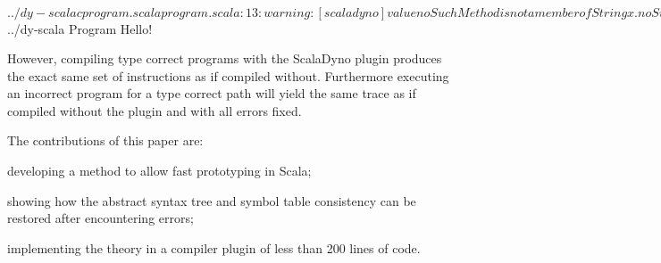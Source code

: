 \begin{lstlisting-nobreak}
$ ../dy-scalac program.scala
program.scala:13: warning: [scaladyno] value noSuchMethod is not a member of String
     x.noSuchMethod()
       ^
one warning found
$ ../dy-scala Program
Hello!
\end{lstlisting-nobreak}

However, compiling type correct programs with the Scala\-Dyno plugin produces the exact same set of instructions as if compiled without. Furthermore executing an incorrect program for a type correct path will yield the same trace as if compiled without the plugin and with all errors fixed.\linebreak

The contributions of this paper are:
\begin{packed_item}
\item developing a method to allow fast prototyping in Scala;
\item showing how the abstract syntax tree and symbol table consistency can be restored after encountering errors;
\item implementing the theory in a compiler plugin of less than 200 lines of code.
\end{packed_item}

